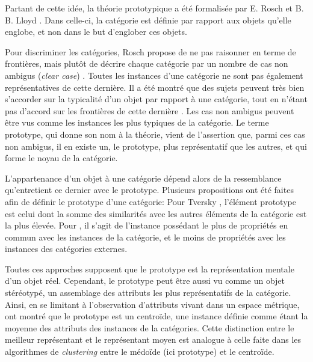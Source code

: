 Partant de cette idée, la théorie prototypique a été formalisée par E. Rosch et B. B. Lloyd \citep{rosch1978cognition}. Dans celle-ci, la catégorie est définie par rapport aux objets qu'elle englobe, et non dans le but d'englober ces objets.

Pour discriminer les catégories, Rosch propose de ne pas raisonner en terme de frontières, mais plutôt de décrire chaque catégorie par un nombre de cas non ambigus (\emph{clear case}) \citep[p. 36]{rosch1978cognition}. Toutes les instances d'une catégorie ne sont pas également représentatives de cette dernière. Il a été montré que des sujets peuvent très bien s'accorder sur la typicalité d'un objet par rapport à une catégorie, tout en n'étant pas d'accord sur les frontières de cette dernière \citep{rosch1974human,rosch1975cognitive}. Les cas non ambigus peuvent être vus comme les instances les plus typiques de la catégorie. Le terme prototype, qui donne son nom à la théorie, vient de l'assertion que, parmi ces cas non ambigus, il en existe un, le prototype, plus représentatif que les autres, et qui forme le noyau de la catégorie.

 L'appartenance d'un objet à une catégorie dépend alors de la ressemblance qu'entretient ce dernier avec le prototype.  Plusieurs propositions ont été faites afin de définir le prototype d'une catégorie: Pour Tversky \citep{tversky1977features}, l'élément prototype est celui dont la somme des similarités avec les autres éléments de la catégorie est la plus élevée. Pour \citep{rosch1975family}, il s'agit de l'instance possédant le plus de propriétés en commun avec les instances de la catégorie, et le moins de propriétés avec les instances des catégories externes.  

Toutes ces approches supposent que le prototype est la représentation mentale d'un objet réel. Cependant, le prototype peut être aussi vu comme un objet stéréotypé, un assemblage des attributs les plus représentatifs de la catégorie. Ainsi, en se limitant à l'observation d'attributs vivant dans un espace métrique, \citep{reed1972pattern, rosch1976structural} ont montré que le prototype est un centroïde, une instance définie comme étant la moyenne des attributs des instances de la catégories. Cette distinction entre le meilleur représentant et le représentant moyen est analogue à celle faite dans les algorithmes de \emph{clustering} entre le médoïde (ici prototype) et le centroïde.

